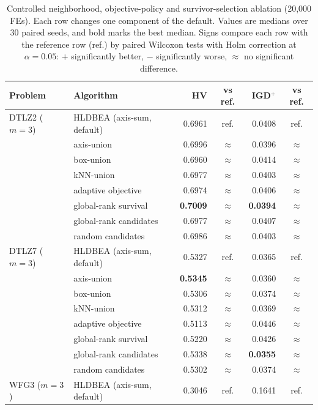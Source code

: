 \begin{table}[!htbp]
\centering
\caption{Controlled neighborhood, objective-policy and survivor-selection ablation (20{,}000 FEs). Each row changes one component of the default. Values are medians over 30 paired seeds, and bold marks the best median. Signs compare each row with the reference row (ref.) by paired Wilcoxon tests with Holm correction at $\alpha=0.05$: $+$ significantly better, $-$ significantly worse, $\approx$ no significant difference.}
\label{tab:geometry_ablation}
\small
\setlength{\tabcolsep}{3pt}
\begin{tabular}{|l|l|r|c|r|c|}
\hline
\textbf{Problem} & \textbf{Algorithm} & \textbf{HV} & \textbf{vs ref.} & \textbf{IGD$^+$} & \textbf{vs ref.} \\ \hline
DTLZ2 ($m=3$) & HLDBEA (axis-sum, default) & 0.6961 & ref. & 0.0408 & ref. \\
 & axis-union & 0.6996 & $\approx$ & 0.0396 & $\approx$ \\
 & box-union & 0.6960 & $\approx$ & 0.0414 & $\approx$ \\
 & kNN-union & 0.6977 & $\approx$ & 0.0403 & $\approx$ \\
 & adaptive objective & 0.6974 & $\approx$ & 0.0406 & $\approx$ \\
 & global-rank survival & \textbf{0.7009} & $\approx$ & \textbf{0.0394} & $\approx$ \\
 & global-rank candidates & 0.6977 & $\approx$ & 0.0407 & $\approx$ \\
 & random candidates & 0.6986 & $\approx$ & 0.0403 & $\approx$ \\
\hline
DTLZ7 ($m=3$) & HLDBEA (axis-sum, default) & 0.5327 & ref. & 0.0365 & ref. \\
 & axis-union & \textbf{0.5345} & $\approx$ & 0.0360 & $\approx$ \\
 & box-union & 0.5306 & $\approx$ & 0.0374 & $\approx$ \\
 & kNN-union & 0.5312 & $\approx$ & 0.0369 & $\approx$ \\
 & adaptive objective & 0.5113 & $\approx$ & 0.0446 & $\approx$ \\
 & global-rank survival & 0.5220 & $\approx$ & 0.0426 & $\approx$ \\
 & global-rank candidates & 0.5338 & $\approx$ & \textbf{0.0355} & $\approx$ \\
 & random candidates & 0.5302 & $\approx$ & 0.0374 & $\approx$ \\
\hline
WFG3 ($m=3$) & HLDBEA (axis-sum, default) & 0.3046 & ref. & 0.1641 & ref. \\

\end{tabular}
\end{table}
